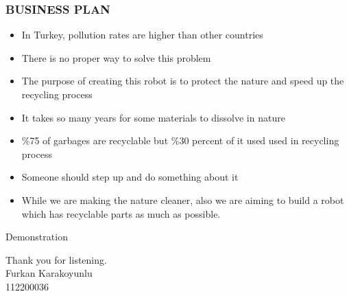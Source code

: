 \documentclass{beamer}
\begin{document}
 \begin{frame}
  \frametitle{BUSINESS PLAN}
  \begin{itemize}
   \item In Turkey, pollution rates are higher than other countries
   \item There is no proper way to solve this problem
   \item The purpose of creating this robot is to protect the nature and speed up the recycling process
   \item It takes so many years for some materials to dissolve in nature
   \item \%75 of garbages are recyclable but \%30 percent of it used used in recycling process
   \item Someone should step up and do something about it
   \item While we are making the nature cleaner, also we are aiming to build a robot which has recyclable parts as much as possible.
  \end{itemize}
 \end{frame}
 
 \begin{frame}
  Demonstration
 \end{frame}
 
  \begin{frame}
  Thank you for listening.\\
  \bigskip
  Furkan Karakoyunlu\\
  112200036
 \end{frame}
\end{document}
